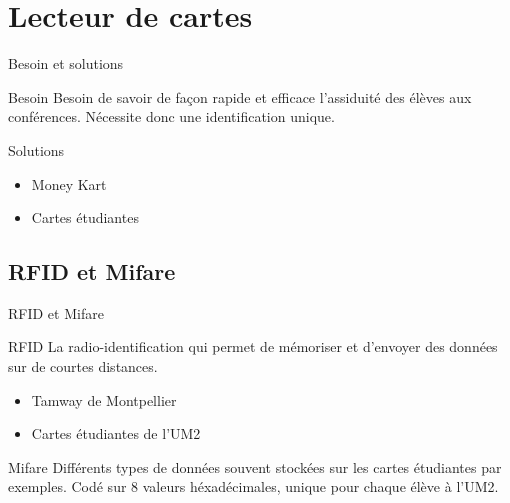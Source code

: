 \section{Lecteur de cartes}
\begin{frame}{Besoin et solutions}
	\begin{block}{Besoin}
        Besoin de savoir de façon rapide et efficace l'assiduité des élèves aux 
        conférences. Nécessite donc une identification unique.
	\end{block}

	\begin{block}{Solutions}
	    \begin{itemize}
            \item Money Kart
            \item Cartes étudiantes
	    \end{itemize}
	\end{block}
\end{frame}


\subsection{RFID et Mifare}
\begin{frame}{RFID et Mifare}
	\begin{block}{RFID}
        La radio-identification qui permet de mémoriser et d'envoyer des données sur
        de courtes distances.

	    \begin{itemize}
            \item Tamway de Montpellier
            \item Cartes étudiantes de l'UM2
	    \end{itemize}
	\end{block}

	\begin{block}{Mifare}
        Différents types de données souvent stockées sur les cartes étudiantes par
        exemples. Codé sur 8 valeurs héxadécimales, unique pour chaque élève à l'UM2.
	\end{block}
\end{frame}


